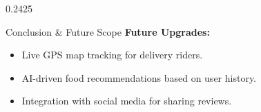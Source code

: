 \documentclass[final]{beamer}
\begin{document}
\begin{frame}[t]
\begin{columns}[t,totalwidth=\textwidth]
\begin{column}{0.2425\textwidth}
\begin{posterbox}{Conclusion \& Future Scope}
\vspace{0.2cm}
\textbf{Future Upgrades:}
\begin{itemize}[leftmargin=1.2em, itemsep=0.1cm,label=\textbullet]
  \item Live GPS map tracking for delivery riders.
  \item AI-driven food recommendations based on user history.
  \item Integration with social media for sharing reviews.
\end{itemize}
\end{posterbox}

\end{column}
\end{columns}

\end{frame}
\end{document}
